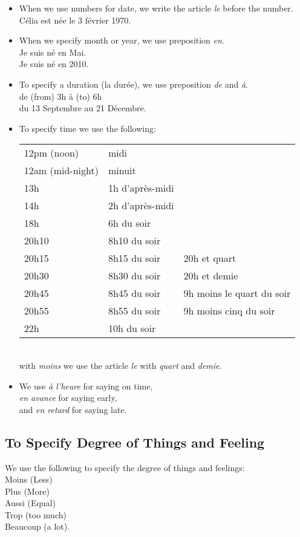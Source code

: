 \begin{itemize}
\item When we use numbers for date, we write the article \emph{le} before the number.\\
C\'elia est n\'ee le 3 f\'evrier 1970.
\item When we specify month or year, we use preposition \emph{en}.\\
Je suis n\'e en Mai.\\
Je suis n\'e en 2010.
\item To specify a duration (la dur\'ee), we use preposition \emph{de} and \emph{\`a}.\\
de (from) 3h \`a (to) 6h\\
du 13 Septembre au 21 D\'ecembre.
\item To specify time we use the following:\\
\begin{tabular}{l l l}
12pm (noon) & midi\\
12am (mid-night) & minuit\\
13h & 1h d'apr\`es-midi\\
14h & 2h d'apr\`es-midi\\
18h & 6h du soir  \\
20h10 & 8h10 du soir\\
20h15 & 8h15 du soir & 20h et quart \\
20h30 & 8h30 du soir & 20h et demie \\
20h45 & 8h45 du soir & 9h moins le quart du soir \\
20h55 & 8h55 du soir & 9h moins cinq du soir \\
22h & 10h du soir \\
\end{tabular}\\
with \emph{moins} we use the article \emph{le} with \emph{quart} and \emph{demie}.
\item We use \emph{\`a l'heure} for saying on time,\\
\emph{en avance} for saying early,\\
and \emph{en retard} for saying late.
\end{itemize}

\subsection{To Specify Degree of Things and Feeling}

We use the following to specify the degree of things and feelings:\\
Moins (Less) \\
Plus (More) \\
Aussi (Equal) \\
Trop (too much) \\
Beaucoup (a lot).

